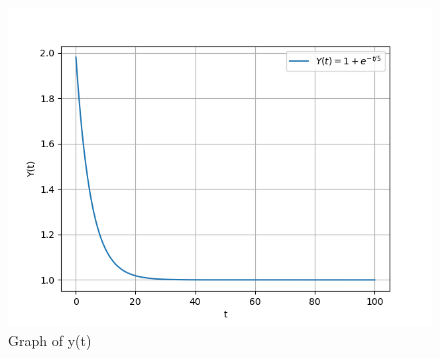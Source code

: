 \documentclass[journal,12pt,twocolumn]{IEEEtran}
\theoremstyle{remark}
\begin{document}
\begin{figure}[!h] 
    \centering
    \includegraphics[width=\columnwidth]{2022/CH/34/figs/Graph_of_y(t).png}
    \caption{Graph of y(t)}
    \label{fig:Graph1_gate_CE_30}
    \end{figure}
\end{document}
